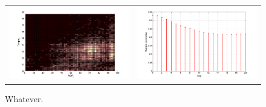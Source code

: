 \begin{figure}
\begin{center}
\begin{tabular}{c@{}c}
\includegraphics[scale=0.2]{./figures/VT_TRQ_ROP_density} &

\includegraphics[scale=0.2]{./figures/VT_crossCorrTRQvsROP}  \\

\end{tabular}
\caption{\label{Figure:VTTorqueRateOfPenetration}  Whatever.}
\end{center}
\end{figure}

